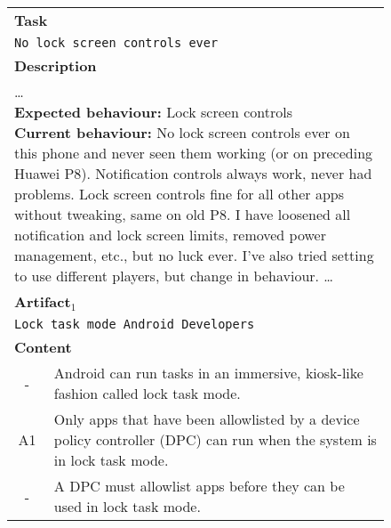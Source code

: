 \begin{landscape}
\begin{figure}
\begin{scriptsize}
\begin{tabular}{cl}
\multicolumn{2}{l}{
\textbf{Task}
}
\\
\multicolumn{2}{l}{\hspace{3mm}
\parbox[l][0.7cm][c]{16cm}{
    \texttt{No lock screen controls ever
}}}
\href{https://github.com/AntennaPod/AntennaPod/issues/3578}{link}
\\
\multicolumn{2}{l}{
\textbf{Description}
}
\\
\multicolumn{2}{l}{
\hspace{3mm}
\parbox[l][2.5cm][c]{19cm}{
{\ttfamily
    \ldots
    \\
    \textbf{Expected behaviour:} Lock screen controls
    \\
    \textbf{Current behaviour:} No lock screen controls ever on this phone and never seen them working (or on preceding Huawei P8). Notification controls always work, never had problems. Lock screen controls fine for all other apps without tweaking, same on old P8. I have loosened all notification and lock screen limits, removed power management, etc., but no luck ever. I've also tried setting to use different players, but change in behaviour. \ldots
}}}
\\
\hline
\hline
\multicolumn{2}{l}{\textbf{Artifact}$_1$}
\\
\multicolumn{2}{l}{\hspace{3mm}
\parbox[l][0.7cm][c]{16cm}{
    \texttt{Lock task mode Android Developers
}}}
\href{https://developer.android.com/work/dpc/dedicated-devices/lock-task-mode}{link}
\\
\multicolumn{2}{l}{\textbf{Content}}
\\
- & 
\parbox[l][0.6cm][c]{20cm}{
{\ttfamily    
    Android can run tasks in an immersive, kiosk-like fashion called lock task mode.
}}
\\
A1 & 
\parbox[l][0.6cm][c]{20cm}{
{\ttfamily    
    Only apps that have been allowlisted by a device policy controller (DPC) can run when the system is in lock task mode.
}} 
\\
- & 
\parbox[l][0.6cm][c]{20cm}{
{\ttfamily    
    A DPC must allowlist apps before they can be used in lock task mode. 
}} 
\\

\end{tabular}
\end{scriptsize}
\end{figure}
\end{landscape}
